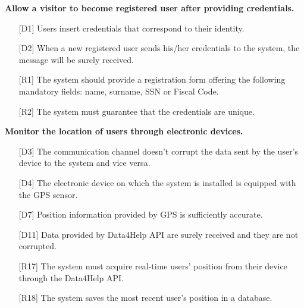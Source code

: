 \begin{enumerate} [resume, label={\bf[G\arabic*]}]
    \item \textbf{Allow a visitor to become registered user after providing credentials.}
        \begin{itemize}
            \item [{[D1]}] Users insert credentials that correspond to their identity.
            \item [{[D2]}] When a new registered user sends his/her credentials to the system, the message will be surely received.
            \item [{[R1]}] The system should provide a registration form offering the following mandatory fields: name, surname, SSN or Fiscal Code.
            \item [{[R2]}] The system must guarantee that the credentials are unique.
        \end{itemize}
        
    \item \textbf{Monitor the location of users through electronic devices.}
        \begin{itemize}
            \item [{[D3]}] The communication channel doesn't corrupt the data sent by the user's device to the system and vice versa.
            \item [{[D4]}] The electronic device on which the system is installed is equipped with the GPS sensor.
            \item [{[D7]}] Position information provided by GPS is sufficiently accurate.
            \item [{[D11]}] Data  provided  by  Data4Help  API  are  surely  received  and  they  are  not corrupted.
            \item [{[R17]}] The system must acquire real-time users' position from their device through the Data4Help API.
            \item [{[R18]}] The system saves the most recent user's position in a database.
        \end{itemize}
        

\end{enumerate}
